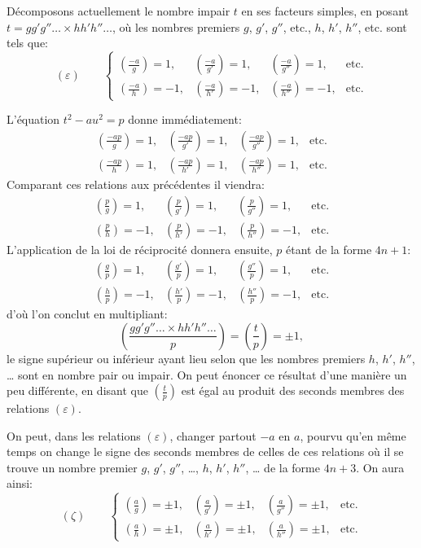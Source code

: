 \documentclass[11pt]{article}
\newcommand{\leg}[2]{\left(\frac{#1}{#2}\right)}
\newcommand{\unitid}[1]{\hypertarget{#1}{}}
\begin{document}
\unitid{dirichlet.v1.p04b.par.021}Décomposons actuellement le nombre impair $t$ en ses facteurs simples, en posant $t=gg'g''\ldots{}\times hh'h''\ldots$, où les nombres premiers $g$, $g'$, $g''$, etc., $h$, $h'$, $h''$, etc. sont tels que:
\unitid{dirichlet.v1.p04b.eq.014}
\[
(\varepsilon)\qquad
\left\{
\begin{array}{llll}
\leg{-a}{g}=1,& \leg{-a}{g'}=1,& \leg{-a}{g''}=1,& \text{etc.}\\[0.3em]
\leg{-a}{h}=-1,& \leg{-a}{h'}=-1,& \leg{-a}{h''}=-1,& \text{etc.}
\end{array}
\right.
\]

\unitid{dirichlet.v1.p04b.par.022}L'équation $t^2-au^2=p$ donne immédiatement:
\unitid{dirichlet.v1.p04b.eq.015}
\[
\begin{array}{llll}
\leg{-ap}{g}=1,& \leg{-ap}{g'}=1,& \leg{-ap}{g''}=1,& \text{etc.}\\[0.3em]
\leg{-ap}{h}=1,& \leg{-ap}{h'}=1,& \leg{-ap}{h''}=1,& \text{etc.}
\end{array}
\]
Comparant ces relations aux précédentes il viendra:
\unitid{dirichlet.v1.p04b.eq.016}
\[
\begin{array}{llll}
\leg{p}{g}=1,& \leg{p}{g'}=1,& \leg{p}{g''}=1,& \text{etc.}\\[0.3em]
\leg{p}{h}=-1,& \leg{p}{h'}=-1,& \leg{p}{h''}=-1,& \text{etc.}
\end{array}
\]
L'application de la loi de réciprocité donnera ensuite, $p$ étant de la forme $4n+1$:
\unitid{dirichlet.v1.p04b.eq.017}
\[
\begin{array}{llll}
\leg{g}{p}=1,& \leg{g'}{p}=1,& \leg{g''}{p}=1,& \text{etc.}\\[0.3em]
\leg{h}{p}=-1,& \leg{h'}{p}=-1,& \leg{h''}{p}=-1,& \text{etc.}
\end{array}
\]
d'où l'on conclut en multipliant:
\unitid{dirichlet.v1.p04b.eq.018}
\[
\leg{gg'g''\ldots{}\times hh'h''\ldots}{p}=\leg{t}{p}=\pm1,
\]
le signe supérieur ou inférieur ayant lieu selon que les nombres premiers $h$, $h'$, $h''$, \ldots{} sont en nombre pair ou impair. On peut énoncer ce résultat d'une manière un peu différente, en disant que $\leg{t}{p}$ est égal au produit des seconds membres des relations $(\varepsilon)$.

\unitid{dirichlet.v1.p04b.par.023}On peut, dans les relations $(\varepsilon)$, changer partout $-a$ en $a$, pourvu qu'en même temps on change le signe des seconds membres de celles de ces relations où il se trouve un nombre premier $g$, $g'$, $g''$, \ldots{}, $h$, $h'$, $h''$, \ldots{} de la forme $4n+3$. On aura ainsi:
\unitid{dirichlet.v1.p04b.eq.019}
\[
(\zeta)\qquad
\left\{
\begin{array}{llll}
\leg{a}{g}=\pm1,& \leg{a}{g'}=\pm1,& \leg{a}{g''}=\pm1,& \text{etc.}\\[0.3em]
\leg{a}{h}=\pm1,& \leg{a}{h'}=\pm1,& \leg{a}{h''}=\pm1,& \text{etc.}
\end{array}
\right.
\]
\end{document}
